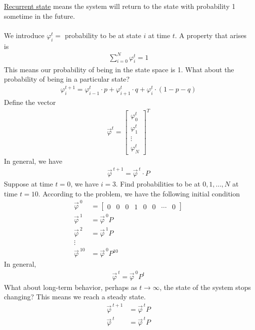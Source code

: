 \documentclass[12pt, letterpaper]{article}
\begin{document}
\underline{Recurrent state} means the system will return to the state with probability 1 sometime
in the future. \\ \\
We introduce $\varphi_i^t = $ probability to be at state $i$ at time $t$. A property that arises
is 
\begin{align*}
    \sum_{i=0}^{N} \varphi_i^t = 1
\end{align*}
This means our probability of being in the state space is 1. What about the probability of 
being in a particular state?
\begin{align*}
    \varphi_i^{t+1} = \varphi^t_{i-1}\cdot p + \varphi_{i+1}^t\cdot q + \varphi_i^t \cdot (1-p-q)
\end{align*}
Define the vector 
\begin{align*}
    \vec \varphi^t = \begin{bmatrix}
        \varphi_0^t \\ \varphi_1^t \\ \vdots \\ \varphi^t_N
    \end{bmatrix}^T
\end{align*}
In general, we have 
\begin{align*}
    \vec\varphi^{\ t+1} = \vec \varphi^{\ t} \cdot P
\end{align*}
Suppose at time $t = 0$, we have $i = 3$. Find probabilities to be at $0,1,\dots, N$ at time
$t = 10$. According to the problem, we have the following initial condition
\begin{align*}
    \vec \varphi^{\ 0} &= \begin{bmatrix}
        0 & 0 & 0 & 1 & 0 & 0 & \cdots & 0
    \end{bmatrix} \\
    \vec \varphi^{\ 1} &= \vec \varphi^{\ 0} P \\
    \vec \varphi^{\ 2} &= \vec \varphi^{\ 1} P  \\
    \vdots \\
    \vec \varphi^{\ 10} &= \vec \varphi^{\ 0} P^{10} 
\end{align*}
In general, 
\begin{align*}
    \boxed{\vec \varphi^{\ t} = \vec \varphi^{\ 0} P^t}
\end{align*}
What about long-term behavior, perhaps as $t \rightarrow \infty$, the state of the system stops 
changing? This means we reach a steady state.
\begin{align*}
    \vec \varphi^{\ t+1} &= \vec \varphi^{\ t} P \\
    \vec \varphi^{\ t} &= \vec \varphi^{\ t} P
\end{align*}
\end{document}
